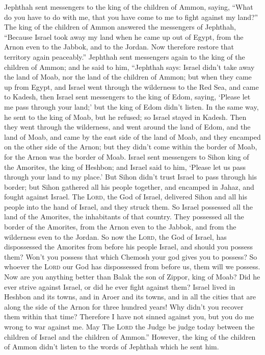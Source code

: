  Jephthah sent messengers to the king of the children of
Ammon, saying, ``What do you have to do with me, that you have come to
me to fight against my land?''  The king of the children
of Ammon answered the messengers of Jephthah, ``Because Israel took away
my land when he came up out of Egypt, from the Arnon even to the Jabbok,
and to the Jordan. Now therefore restore that territory again
peaceably.''  Jephthah sent messengers again to the king
of the children of Ammon;  and he said to him, ``Jephthah
says: Israel didn't take away the land of Moab, nor the land of the
children of Ammon;  but when they came up from Egypt, and
Israel went through the wilderness to the Red Sea, and came to Kadesh,
 then Israel sent messengers to the king of Edom, saying,
`Please let me pass through your land;' but the king of Edom didn't
listen. In the same way, he sent to the king of Moab, but he refused; so
Israel stayed in Kadesh.  Then they went through the
wilderness, and went around the land of Edom, and the land of Moab, and
came by the east side of the land of Moab, and they encamped on the
other side of the Arnon; but they didn't come within the border of Moab,
for the Arnon was the border of Moab.  Israel sent
messengers to Sihon king of the Amorites, the king of Heshbon; and
Israel said to him, `Please let us pass through your land to my place.'
 But Sihon didn't trust Israel to pass through his
border; but Sihon gathered all his people together, and encamped in
Jahaz, and fought against Israel.  The \textsc{Lord}, the
God of Israel, delivered Sihon and all his people into the hand of
Israel, and they struck them. So Israel possessed all the land of the
Amorites, the inhabitants of that country.  They
possessed all the border of the Amorites, from the Arnon even to the
Jabbok, and from the wilderness even to the Jordan.  So
now the \textsc{Lord}, the God of Israel, has dispossessed the Amorites
from before his people Israel, and should you possess them?
 Won't you possess that which Chemosh your god gives you
to possess? So whoever the \textsc{Lord} our God has dispossessed from
before us, them will we possess.  Now are you anything
better than Balak the son of Zippor, king of Moab? Did he ever strive
against Israel, or did he ever fight against them? 
Israel lived in Heshbon and its towns, and in Aroer and its towns, and
in all the cities that are along the side of the Arnon for three hundred
years! Why didn't you recover them within that time? 
Therefore I have not sinned against you, but you do me wrong to war
against me. May The \textsc{Lord} the Judge be judge today between the
children of Israel and the children of Ammon.''  However,
the king of the children of Ammon didn't listen to the words of Jephthah
which he sent him.

